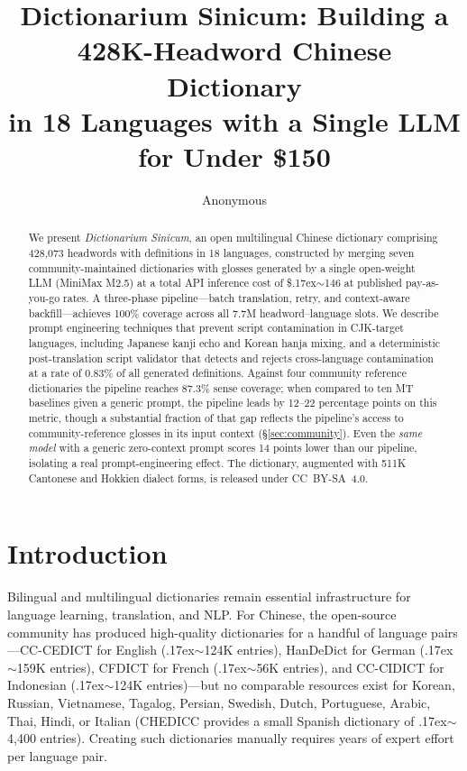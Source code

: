 \documentclass[11pt]{article}
\title{Dictionarium Sinicum: Building a 428K-Headword Chinese Dictionary\\in 18 Languages with a Single LLM for Under \$150}
\author{Anonymous}
\begin{document}
\maketitle

\begin{abstract}
We present \textit{Dictionarium Sinicum}, an open multilingual Chinese dictionary comprising 428,073 headwords with definitions in 18 languages, constructed by merging seven community-maintained dictionaries with glosses generated by a single open-weight LLM (MiniMax M2.5) at a total API inference cost of \${\raise.17ex\hbox{$\scriptstyle\sim$}}146 at published pay-as-you-go rates. A three-phase pipeline---batch translation, retry, and context-aware backfill---achieves 100\% coverage across all 7.7M headword--language slots. We describe prompt engineering techniques that prevent script contamination in CJK-target languages, including Japanese kanji echo and Korean hanja mixing, and a deterministic post-translation script validator that detects and rejects cross-language contamination at a rate of 0.83\% of all generated definitions. Against four community reference dictionaries the pipeline reaches 87.3\% sense coverage; when compared to ten MT baselines given a generic prompt, the pipeline leads by 12--22 percentage points on this metric, though a substantial fraction of that gap reflects the pipeline's access to community-reference glosses in its input context (\S\ref{sec:community}). Even the \textit{same model} with a generic zero-context prompt scores 14 points lower than our pipeline, isolating a real prompt-engineering effect. The dictionary, augmented with 511K Cantonese and Hokkien dialect forms, is released under CC~BY-SA~4.0.
\end{abstract}

\section{Introduction}
\label{sec:intro}

Bilingual and multilingual dictionaries remain essential infrastructure for language learning, translation, and NLP\@. For Chinese, the open-source community has produced high-quality dictionaries for a handful of language pairs---CC-CEDICT for English ({\raise.17ex\hbox{$\scriptstyle\sim$}}124K entries), HanDeDict for German ({\raise.17ex\hbox{$\scriptstyle\sim$}}159K entries), CFDICT for French ({\raise.17ex\hbox{$\scriptstyle\sim$}}56K entries), and CC-CIDICT for Indonesian ({\raise.17ex\hbox{$\scriptstyle\sim$}}124K entries)---but no comparable resources exist for Korean, Russian, Vietnamese, Tagalog, Persian, Swedish, Dutch, Portuguese, Arabic, Thai, Hindi, or Italian (CHEDICC provides a small Spanish dictionary of {\raise.17ex\hbox{$\scriptstyle\sim$}}4,400 entries). Creating such dictionaries manually requires years of expert effort per language pair.
\end{document}
